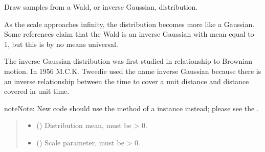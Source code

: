 \documentclass[letterpaper,10pt,english]{sphinxmanual}
\begin{document}
\begin{fulllineitems}
\end{fulllineitems}


\begin{fulllineitems}
\label{\detokenize{metilda.controllers:metilda.controllers.pitch_art_wizard.wald}}
\pysigstartsignatures
{}
\pysigstopsignatures
\sphinxAtStartPar
Draw samples from a Wald, or inverse Gaussian, distribution.

\sphinxAtStartPar
As the scale approaches infinity, the distribution becomes more like a
Gaussian. Some references claim that the Wald is an inverse Gaussian
with mean equal to 1, but this is by no means universal.

\sphinxAtStartPar
The inverse Gaussian distribution was first studied in relationship to
Brownian motion. In 1956 M.C.K. Tweedie used the name inverse Gaussian
because there is an inverse relationship between the time to cover a
unit distance and distance covered in unit time.

\begin{sphinxadmonition}{note}{Note:}
\sphinxAtStartPar
New code should use the 
method of a  instance instead;
please see the .
\end{sphinxadmonition}
\begin{quote}\begin{description}
\begin{itemize}
\item {} 
\sphinxAtStartPar
{} () \textendash{} Distribution mean, must be \textgreater{} 0.

\item {} 
\sphinxAtStartPar
{} () \textendash{} Scale parameter, must be \textgreater{} 0.


\end{itemize}
\end{description}
\end{quote}
\end{fulllineitems}
\end{document}
